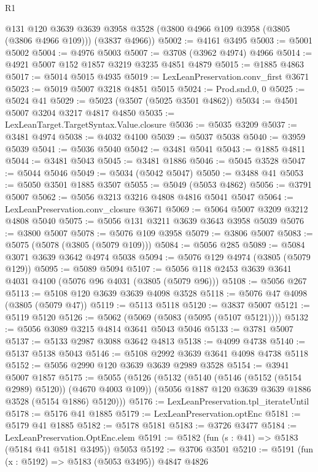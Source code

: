 \begin{lexlean}{R1}
\begin{coremodule}
      @131
      @120
      @3639
      @3639
      @3958
      @3528
      (@3800 @4966 @109 @3958 (@3805 (@3806 @4966 @109)))
      (@3837 @4966))
@5002 := @4161 @3495
@5003 := @5001 @5002
@5004 := @4976 @5003
@5007 := @3708 (@3962 @4974) @4966
@5014 := @4921 @5007 @152 @1857 @3219 @3235 @4851 @4879
@5015 := @1885 @4863
@5017 := @5014 @5015 @4935
@5019 := LexLeanPreservation.conv_first @3671
@5023 := @5019 @5007 @3218 @4851 @5015
@5024 := Prod.snd.{0, 0}
@5025 := @5024 @41
@5029 := @5023 (@3507 (@5025 @3501 @4862))
@5034 := @4501 @5007 @3204 @3217 @4817 @4850
@5035 := LexLeanTarget.TargetSyntax.Value.closure
@5036 := @5035 @3209
@5037 := @3481 @4974
@5038 := @4032 @4100
@5039 := @5037 @5038
@5040 := @3959 @5039
@5041 := @5036 @5040
@5042 := @3481 @5041
@5043 := @1885 @4811
@5044 := @3481 @5043
@5045 := @3481 @1886
@5046 := @5045 @3528
@5047 := @5044 @5046
@5049 := @5034 (@5042 @5047)
@5050 := @3488 @41
@5053 := @5050 @3501 @1885 @3507
@5055 := @5049 (@5053 @4862)
@5056 := @3791 @5007
@5062 := @5056 @3213 @3216 @4808 @4816 @5041 @5047
@5064 := LexLeanPreservation.conv_closure @3671
@5069 := @5064 @5007 @3209 @3212 @4808 @5040
@5075 := @5056 @131 @3211 @3639 @3643 @3958 @5039
@5076 := @3800 @5007
@5078 := @5076 @109 @3958
@5079 := @3806 @5007
@5083 := @5075 (@5078 (@3805 (@5079 @109)))
@5084 := @5056 @285
@5089 := @5084 @3071 @3639 @3642 @4974 @5038
@5094 := @5076 @129 @4974 (@3805 (@5079 @129))
@5095 := @5089 @5094
@5107 := @5056 @118 @2453 @3639 @3641 @4031 @4100 (@5076 @96 @4031 (@3805 (@5079 @96)))
@5108 := @5056 @267
@5113 := @5108 @120 @3639 @3639 @4098 @3528
@5118 := @5076 @47 @4098 (@3805 (@5079 @47))
@5119 := @5113 @5118
@5120 := @3837 @5007
@5121 := @5119 @5120
@5126 := @5062 (@5069 (@5083 (@5095 (@5107 @5121))))
@5132 := @5056 @3089 @3215 @4814 @3641 @5043 @5046
@5133 := @3781 @5007
@5137 := @5133 @2987 @3088 @3642 @4813
@5138 := @4099 @4738
@5140 := @5137 @5138 @5043
@5146 := @5108 @2992 @3639 @3641 @4098 @4738 @5118
@5152 := @5056 @2990 @120 @3639 @3639 @2989 @3528
@5154 := @3941 @5007 @1857
@5175 := @5055
    (@5126
      (@5132
        (@5140 (@5146 (@5152 (@5154 @2989) @5120)) (@4670 @4003 @109))
        (@5056 @1887 @120 @3639 @3639 @1886 @3528 (@5154 @1886) @5120)))
@5176 := LexLeanPreservation.tpl_iterateUntil
@5178 := @5176 @41 @1885
@5179 := LexLeanPreservation.optEnc
@5181 := @5179 @41 @1885
@5182 := @5178 @5181
@5183 := @3726 @3477
@5184 := LexLeanPreservation.OptEnc.elem
@5191 := @5182 (fun (s : @41) => @5183 (@5184 @41 @5181 @3495)) @5053
@5192 := @3706 @3501
@5210 := @5191
    (fun (x : @5192) => @5183 (@5053 @3495))
    @4847
    @4826

\end{coremodule}
\end{lexlean}
